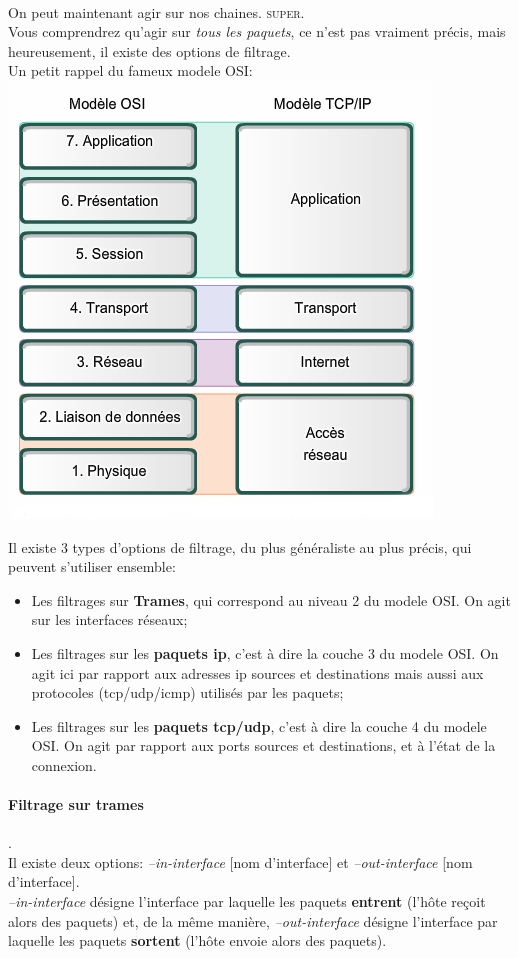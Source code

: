 \documentclass{article}
\begin{document}
\paragraph{}
On peut maintenant agir sur nos chaines. \textsc{super.} \\
Vous comprendrez qu'agir sur \emph{tous les paquets}, ce n'est pas vraiment précis, mais heureusement, il existe des options de filtrage.\\
Un petit rappel du fameux modele \textsc{OSI}: \\
\includegraphics[scale=0.5]{osi.png}

Il existe 3 types d'options de filtrage, du plus généraliste au plus précis, qui peuvent s'utiliser ensemble:
\begin{itemize}
\item{Les filtrages sur \textbf{Trames}, qui correspond au niveau 2 du modele OSI. On agit sur les interfaces réseaux;}
\item{Les filtrages sur les \textbf{paquets ip}, c'est à dire la couche 3 du modele OSI. On agit ici par rapport aux adresses ip sources et destinations mais aussi aux protocoles (tcp/udp/icmp) utilisés par les paquets;}
\item{Les filtrages sur les \textbf{paquets tcp/udp}, c'est à dire la couche 4 du modele OSI. On agit par rapport aux ports sources et destinations, et à l'état de la connexion.}
\end{itemize}

\paragraph{Filtrage sur trames}.\\
Il existe deux options: \emph{--in-interface} [nom d'interface] et \emph{--out-interface} [nom d'interface].\\
\emph{--in-interface} désigne l'interface par laquelle les paquets \textbf{entrent} (l'hôte reçoit alors des paquets) et, de la même manière, \emph{--out-interface} désigne l'interface par laquelle les paquets \textbf{sortent} (l'hôte envoie alors des paquets).
\end{document}

